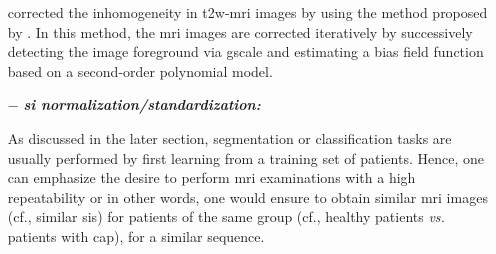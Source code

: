 \begin{enumerate}[leftmargin=*]
\cite{Lv2009} corrected the inhomogeneity in \ac{t2w}-\ac{mri} images by using the method proposed by \cite{Madabhushi2006}. In this method, the \ac{mri} images are corrected iteratively by successively detecting the image foreground via \ac{gscale} and estimating a bias field function based on a second-order polynomial model.%
%
%
%
%
%

\item[$-$] \textbf{\textit{\Ac{si} normalization/standardization:}}

As discussed in the later section, segmentation or classification tasks are usually performed by first learning from a training set of patients. Hence, one can emphasize the desire to perform \ac{mri} examinations with a high repeatability or in other words, one would ensure to obtain similar \ac{mri} images (cf., similar \acp{si}) for patients of the same group (cf., healthy patients \textit{vs.} patients with \ac{cap}), for a similar sequence.


\end{enumerate}
